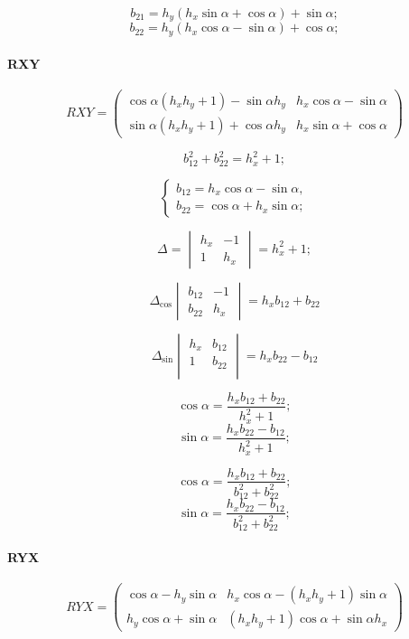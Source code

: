 $$b_{21} = {h_y}\left( {h_x}\sin\alpha + \cos\alpha\right) +  \sin\alpha;$$
$$b_{22} = {h_y}\left( {h_x}\cos\alpha - \sin\alpha\right) +  \cos\alpha;$$

\paragraph{RXY}

\[
RXY =
\begin{pmatrix}
	\cos\alpha \left( {h_x} {h_y}+1\right) -\sin\alpha {h_y} & 
	{h_x} \cos\alpha -\sin\alpha\\
	\sin\alpha \left( {h_x} {h_y}+1\right) +\cos\alpha {h_y} & 
	{h_x} \sin\alpha +\cos\alpha
\end{pmatrix}
\]

$$b_{12}^2 + b_{22}^2 = h_x^2 + 1;$$

$$\begin{cases}
	b_{12} = {h_x} \cos\alpha -\sin\alpha,\\
	b_{22} = \cos\alpha + {h_x} \sin\alpha;
\end{cases}$$

$$\Delta = \begin{vmatrix}
	h_x & -1\\
	1 & h_x
\end{vmatrix} = h_x^2 + 1;$$

$$\Delta_{\cos}\begin{vmatrix}
	b_{12} & -1\\
	b_{22} & h_x
\end{vmatrix} = h_x b_{12} + b_{22}$$

$$\Delta_{\sin}\begin{vmatrix}
	h_x & b_{12}\\
	1 & b_{22}\\
\end{vmatrix} = h_x b_{22} - b_{12}$$

$$\cos\alpha = \frac{h_x b_{12} + b_{22}}{h_x^2 + 1};$$
$$\sin\alpha = \frac{h_x b_{22} - b_{12}}{h_x^2 + 1};$$

$$\cos\alpha = \frac{h_x b_{12} + b_{22}}{b_{12}^2 + b_{22}^2};$$
$$\sin\alpha = \frac{h_x b_{22} - b_{12}}{b_{12}^2 + b_{22}^2};$$

\paragraph{RYX}

\[
RYX = 
\begin{pmatrix}
	\cos\alpha - {h_y} \sin\alpha &
	{h_x} \cos\alpha - \left( {h_x} {h_y} + 1\right) \sin\alpha \\
	{h_y} \cos\alpha + \sin\alpha & 
	\left( {h_x} {h_y} + 1\right)\cos\alpha + \sin\alpha {h_x}
\end{pmatrix}
\]

